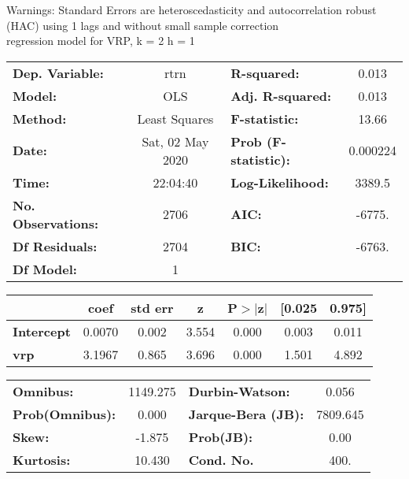Warnings: \newline
 [1] Standard Errors are heteroscedasticity and autocorrelation robust (HAC) using 1 lags and without small sample correction\\ 

regression model for VRP, k = 2 h = 1\begin{center}
\begin{tabular}{lclc}
\toprule
\textbf{Dep. Variable:}    &       rtrn       & \textbf{  R-squared:         } &     0.013   \\
\textbf{Model:}            &       OLS        & \textbf{  Adj. R-squared:    } &     0.013   \\
\textbf{Method:}           &  Least Squares   & \textbf{  F-statistic:       } &     13.66   \\
\textbf{Date:}             & Sat, 02 May 2020 & \textbf{  Prob (F-statistic):} &  0.000224   \\
\textbf{Time:}             &     22:04:40     & \textbf{  Log-Likelihood:    } &    3389.5   \\
\textbf{No. Observations:} &        2706      & \textbf{  AIC:               } &    -6775.   \\
\textbf{Df Residuals:}     &        2704      & \textbf{  BIC:               } &    -6763.   \\
\textbf{Df Model:}         &           1      & \textbf{                     } &             \\
\bottomrule
\end{tabular}
\begin{tabular}{lcccccc}
                   & \textbf{coef} & \textbf{std err} & \textbf{z} & \textbf{P$> |$z$|$} & \textbf{[0.025} & \textbf{0.975]}  \\
\midrule
\textbf{Intercept} &       0.0070  &        0.002     &     3.554  &         0.000        &        0.003    &        0.011     \\
\textbf{vrp}       &       3.1967  &        0.865     &     3.696  &         0.000        &        1.501    &        4.892     \\
\bottomrule
\end{tabular}
\begin{tabular}{lclc}
\textbf{Omnibus:}       & 1149.275 & \textbf{  Durbin-Watson:     } &    0.056  \\
\textbf{Prob(Omnibus):} &   0.000  & \textbf{  Jarque-Bera (JB):  } & 7809.645  \\
\textbf{Skew:}          &  -1.875  & \textbf{  Prob(JB):          } &     0.00  \\
\textbf{Kurtosis:}      &  10.430  & \textbf{  Cond. No.          } &     400.  \\
\bottomrule
\end{tabular}
\end{center}

